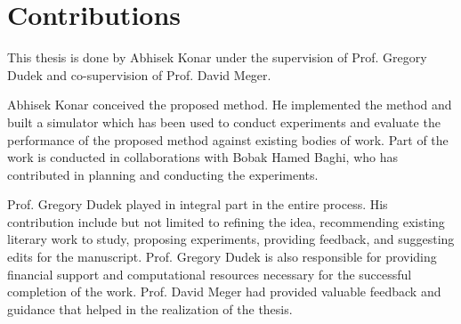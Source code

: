 \chapter*{\rm\bfseries Contributions}
This thesis is done by Abhisek Konar under the supervision of Prof. Gregory Dudek and co-supervision of Prof. David Meger.  
\par
Abhisek Konar conceived the proposed method. He implemented the method and built a simulator which has been used to conduct experiments and evaluate the performance of the proposed method against existing bodies of work. Part of the work is conducted in collaborations with Bobak Hamed Baghi, who has contributed in planning and conducting the experiments. 
\par
Prof. Gregory Dudek played in integral part in the entire process. His contribution include but not limited to refining the idea, recommending existing literary work to study, proposing experiments, providing feedback, and suggesting edits for the manuscript. Prof. Gregory Dudek is also responsible for providing financial support and computational resources necessary for the successful completion of the work. Prof. David Meger had provided valuable feedback and guidance that helped in the  realization of the thesis.